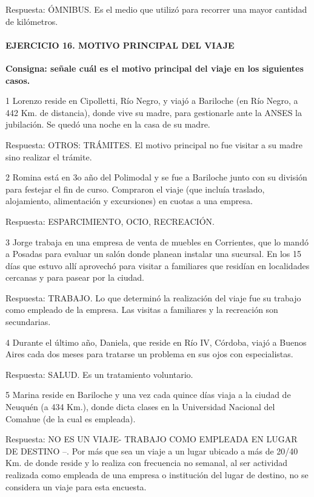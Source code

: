 \documentclass[
  openany]{book}
\begin{document}
Respuesta: ÓMNIBUS. Es el medio que utilizó para recorrer una mayor cantidad de kilómetros.

\hypertarget{ejercicio-16.-motivo-principal-del-viaje-1}{%
\paragraph{\texorpdfstring{\textbf{EJERCICIO 16. MOTIVO PRINCIPAL DEL VIAJE}}{EJERCICIO 16. MOTIVO PRINCIPAL DEL VIAJE}}\label{ejercicio-16.-motivo-principal-del-viaje-1}}

\textbf{Consigna: señale cuál es el motivo principal del viaje en los siguientes casos.}

1 Lorenzo reside en Cipolletti, Río Negro, y viajó a Bariloche (en Río Negro, a 442 Km. de distancia), donde vive su madre, para gestionarle ante la ANSES la jubilación. Se quedó una noche en la casa de su madre.

Respuesta: OTROS: TRÁMITES. El motivo principal no fue visitar a su madre sino realizar el trámite.

2 Romina está en 3o año del Polimodal y se fue a Bariloche junto con su división para festejar el fin de curso. Compraron el viaje (que incluía traslado, alojamiento, alimentación y excursiones) en cuotas a una empresa.

Respuesta: ESPARCIMIENTO, OCIO, RECREACIÓN.

3 Jorge trabaja en una empresa de venta de muebles en Corrientes, que lo mandó a Posadas para evaluar un salón donde planean instalar una sucursal. En los 15 días que estuvo allí aprovechó para visitar a familiares que residían en localidades cercanas y para pasear por la ciudad.

Respuesta: TRABAJO. Lo que determinó la realización del viaje fue su trabajo como empleado de la empresa. Las visitas a familiares y la recreación son secundarias.

4 Durante el último año, Daniela, que reside en Río IV, Córdoba, viajó a Buenos Aires cada dos meses para tratarse un problema en sus ojos con especialistas.

Respuesta: SALUD. Es un tratamiento voluntario.

5 Marina reside en Bariloche y una vez cada quince días viaja a la ciudad de Neuquén (a 434 Km.), donde dicta clases en la Universidad Nacional del Comahue (de la cual es empleada).

Respuesta: NO ES UN VIAJE- TRABAJO COMO EMPLEADA EN LUGAR DE DESTINO --. Por más que sea un viaje a un lugar ubicado a más de 20/40 Km. de donde reside y lo realiza con frecuencia no semanal, al ser actividad realizada como empleada de una empresa o institución del lugar de destino, no se considera un viaje para esta encuesta.
\end{document}
